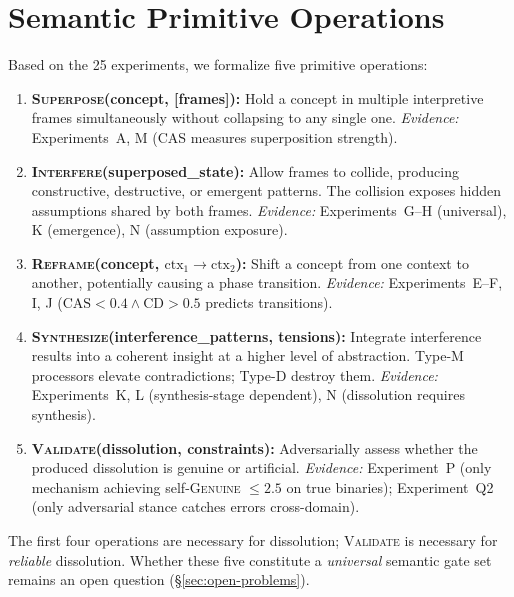 \documentclass[11pt,a4paper]{article}
\newcommand{\CAS}{\mathrm{CAS}}
\newcommand{\CD}{\mathrm{CD}}
\begin{document}
\section{Semantic Primitive Operations}

Based on the 25 experiments, we formalize five primitive operations:

\begin{enumerate}
\item \textbf{\textsc{Superpose}(concept, [frames]):} Hold a concept in multiple interpretive frames simultaneously without collapsing to any single one. \emph{Evidence:} Experiments~A, M (CAS measures superposition strength).

\item \textbf{\textsc{Interfere}(superposed\_state):} Allow frames to collide, producing constructive, destructive, or emergent patterns. The collision exposes hidden assumptions shared by both frames. \emph{Evidence:} Experiments~G--H (universal), K (emergence), N (assumption exposure).

\item \textbf{\textsc{Reframe}(concept, $\text{ctx}_1 \to \text{ctx}_2$):} Shift a concept from one context to another, potentially causing a phase transition. \emph{Evidence:} Experiments~E--F, I, J ($\CAS < 0.4 \wedge \CD > 0.5$ predicts transitions).

\item \textbf{\textsc{Synthesize}(interference\_patterns, tensions):} Integrate interference results into a coherent insight at a higher level of abstraction. Type-M processors elevate contradictions; Type-D destroy them. \emph{Evidence:} Experiments~K, L (synthesis-stage dependent), N (dissolution requires synthesis).

\item \textbf{\textsc{Validate}(dissolution, constraints):} Adversarially assess whether the produced dissolution is genuine or artificial. \emph{Evidence:} Experiment~P (only mechanism achieving self-\textsc{Genuine} $\leq 2.5$ on true binaries); Experiment~Q2 (only adversarial stance catches errors cross-domain).
\end{enumerate}

The first four operations are necessary for dissolution; \textsc{Validate} is necessary for \emph{reliable} dissolution. Whether these five constitute a \emph{universal} semantic gate set remains an open question (\S\ref{sec:open-problems}).
\end{document}
